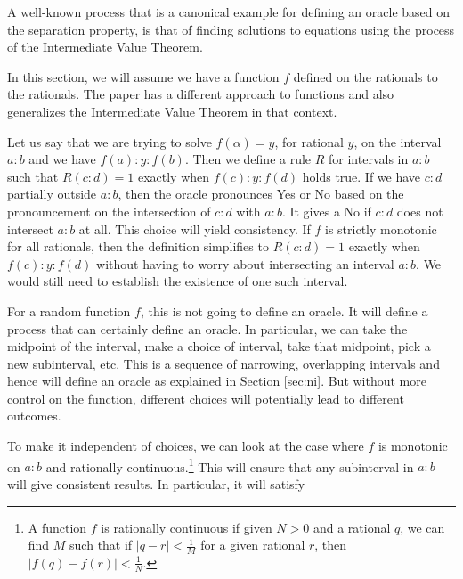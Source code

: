 \documentclass[12pt]{article}
\begin{document}
A well-known process that is a canonical example for defining an oracle based on the separation property, is that of finding solutions to equations using the process of the Intermediate Value Theorem. 

In this section, we will assume we have a function $f$ defined on the rationals to the rationals. The paper \cite{taylor23funora} has a different approach to functions and also generalizes the Intermediate Value Theorem in that context. 

Let us say that we are trying to solve $f(\alpha) = y$, for rational $y$, on the interval $a:b$ and we have $f(a):y:f(b)$. Then we define a rule $R$ for intervals in $a:b$ such that $R(c:d) = 1$ exactly when $f(c):y:f(d)$ holds true. If we have $c:d$ partially outside $a:b$, then the oracle pronounces Yes or No based on the pronouncement on the intersection of $c:d$ with $a:b$. It gives a No if $c:d$ does not intersect $a:b$ at all. This choice will yield consistency. If $f$ is strictly monotonic for all rationals, then the definition simplifies to $R(c:d)=1$ exactly when $f(c):y:f(d)$ without having to worry about intersecting an interval $a:b$. We would still need to establish the existence of one such interval. 

For a random function $f$, this is not going to define an oracle. It will define a process that can certainly define an oracle. In particular, we can take the midpoint of the interval, make a choice of interval, take that midpoint, pick a new subinterval, etc. This is a sequence of narrowing, overlapping intervals and hence will define an oracle as explained in Section \ref{sec:ni}. But without more control on the function, different choices will potentially lead to different outcomes. 

To make it independent of choices, we can look at the case where $f$ is monotonic on $a:b$ and rationally continuous.\footnote{A function $f$ is rationally continuous if given $N >0$ and a rational $q$, we can find $M$ such that if $|q-r|<\frac{1}{M}$ for a given rational $r$, then $|f(q)-f(r)| < \frac{1}{N}$.} This will ensure that any subinterval in $a:b$ will give consistent results. In particular, it will satisfy
\end{document}
